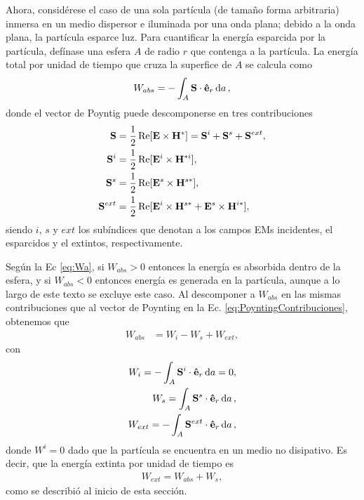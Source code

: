 Ahora, considérese el caso de una sola partícula (de tamaño  forma arbitraria) inmersa en un medio dispersor e iluminada por una onda plana; debido a la onda plana, la partícula esparce luz.  Para cuantificar la energía esparcida por la partícula, defínase una esfera $A$ de radio $r$ que contenga a la partícula. La energía total  por unidad de tiempo que cruza la superfice de $A$ se calcula como
%
\begin{align}
W_{abs} = -\int_A\vb{S}\cdot \vu{e}_r \dd{a},
\label{eq:Wa}
\end{align}
%
donde el vector de Poyntig  puede descomponerse en tres contribuciones
%
\begin{align}
\vb{S} &= \frac12 \Re[\vb{E}\times\vb{H}^*] = \vb{S}^i + \vb{S}^s + \vb{S}^{ext},
\label{eq:PoyntingContribuciones}\\
\vb{S}^i &= \frac12 \Re[\vb{E}^i\times\vb{H}^{*i}], \\
 \vb{S}^s &= \frac12 \Re[\vb{E}^s\times\vb{H}^{s*}] ,\\
\vb{S}^{ext} &= \frac12 \Re[\vb{E}^i\times\vb{H}^{s*} + \vb{E}^s \times\vb{H}^{i*}],
\label{eq:Sext}
\end{align}
%
siendo $i$, $s$ y $ext$ los subíndices que denotan a los campos EMs incidentes, el esparcidos y el extintos, respectivamente.

Según la Ec \eqref{eq:Wa}, si $W_{abs}>0$ entonces la energía es absorbida dentro de la esfera, y si $W_{abs}<0$ entonces energía es generada en la partícula, aunque a lo largo de este texto se excluye este caso. Al descomponer a $W_{abs}$ en las mismas contribuciones que al  vector de Poynting en la Ec. \eqref{eq:PoyntingContribuciones}, obtenemos que
%
\begin{align}
W_{abs} &= W_i -W_s + W_{ext},
\end{align}
%
con
%
\begin{align}
W_{i} = -\int_A\vb{S}^i\cdot \vu{e}_r \dd{a} = 0,\\
W_s = \int_A\vb{S}^s\cdot \vu{e}_r \dd{a},\\
W_{ext} = -\int_A\vb{S}^{ext}\cdot \vu{e}_r \dd{a},
\end{align}
%
donde $W^i=0$ dado que la partícula se encuentra en un medio no disipativo. Es decir, que la energía extinta por unidad de tiempo es
%
\begin{align}
W_{ext} = W_{abs} + W_s,
\end{align}
%
como se describió al inicio de esta sección.	

